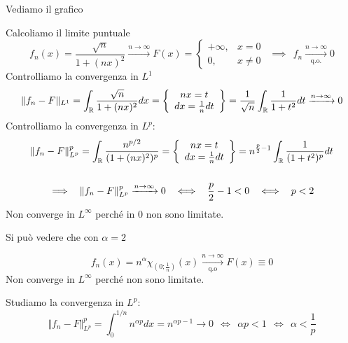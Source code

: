 Vediamo il grafico


Calcoliamo il limite puntuale
\begin{equation*}
f_{n} (x) = \frac{\sqrt{n}}{1 + (nx)^{2}}\xrightarrow{n\rightarrow \infty } F(x) = \begin{cases}
+ \infty , & x = 0\\
0, & x\neq 0
\end{cases} \ \ \implies \ \ f_{n}\xrightarrow[\text{q.o.}]{n\rightarrow \infty } 0
\end{equation*}
Controlliamo la convergenza in $L^{1}$
\begin{equation*}
\Vert f_{n} - F\Vert _{L^{1}} = \int _{\mathbb{R} }\frac{\sqrt{n}}{1 + (nx)^{2}} dx = \left\{\begin{array}{ c }
nx = t\\
dx = \frac{1}{n} dt
\end{array}\right\} = \frac{1}{\sqrt{n}}\int _{\mathbb{R} }\frac{1}{1 + t^{2}} dt\xrightarrow{n\rightarrow \infty } 0
\end{equation*}
Controlliamo la convergenza in $L^{p}$:
\begin{gather*}
\Vert f_{n} - F\Vert ^{p}_{L^{p}} = \int _{\mathbb{R} }\frac{n^{p/2}}{(1 + (nx)^{2})^{p}} = \left\{\begin{array}{ c }
nx = t\\
dx = \frac{1}{n} dt
\end{array}\right\} = n^{\frac{p}{2} - 1}\int _{\mathbb{R} }\frac{1}{(1 + t^{2})^{p}} dt\\
\\
\implies \ \ \Vert f_{n} - F\Vert ^{p}_{L^{p}}\xrightarrow{n\rightarrow \infty } 0\ \ \iff \ \ \frac{p}{2} - 1 < 0\ \ \iff \ \ p < 2
\end{gather*}
Non converge in $L^{\infty }$ perché in $0$ non sono limitate.
\Soluzione

Si può vedere che con $\alpha = 2$

\begin{equation*}
f_{n} (x) = n^{\alpha } \chi _{\left(0;\frac{1}{n}\right)} (x)\xrightarrow[\text{q.o}]{n\rightarrow \infty } F(x)\equiv 0
\end{equation*}
Non converge in $L^{\infty }$ perché non sono limitate.

Studiamo la convergenza in $L^{p}$:
\begin{equation*}
\Vert f_{n} - F\Vert ^{p}_{L^{p}} = \int ^{1/n}_{0} n^{\alpha p} dx = n^{\alpha p - 1}\rightarrow 0\ \ \iff \ \ \alpha p < 1\ \ \iff \ \ \alpha < \frac{1}{p}
\end{equation*}
\Soluzione

